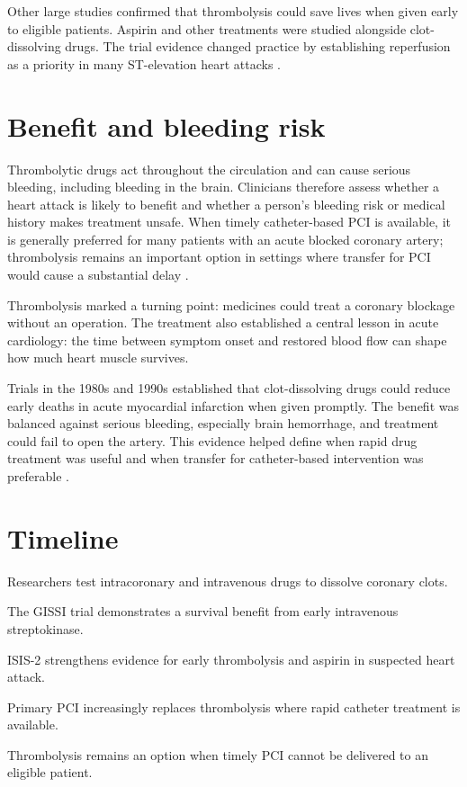 \documentclass[12pt,oneside]{book}
\begin{document}
Other large studies confirmed that thrombolysis could save lives when
given early to eligible patients. Aspirin and other treatments were
studied alongside clot-dissolving drugs. The trial evidence changed
practice by establishing reperfusion as a priority in many ST-elevation
heart attacks \cite{miTreatmentHistory}.

\section{Benefit and bleeding risk}
Thrombolytic drugs act throughout the circulation and can cause serious
bleeding, including bleeding in the brain. Clinicians therefore assess
whether a heart attack is likely to benefit and whether a person's
bleeding risk or medical history makes treatment unsafe. When timely
catheter-based PCI is available, it is generally preferred for many
patients with an acute blocked coronary artery; thrombolysis remains an
important option in settings where transfer for PCI would cause a
substantial delay \cite{ahaAcuteCoronaryGuideline}.

Thrombolysis marked a turning point: medicines could treat a coronary
blockage without an operation. The treatment also established a central
lesson in acute cardiology: the time between symptom onset and restored
blood flow can shape how much heart muscle survives.

Trials in the 1980s and 1990s established that clot-dissolving drugs could
reduce early deaths in acute myocardial infarction when given promptly. The
benefit was balanced against serious bleeding, especially brain hemorrhage,
and treatment could fail to open the artery. This evidence helped define when
rapid drug treatment was useful and when transfer for catheter-based
intervention was preferable
\cite{gissiTrial,miTreatmentHistory,ahaAcuteCoronaryGuideline}.

\section*{Timeline}
\begin{description}[leftmargin=2.3cm,style=nextline]
  \item[1950s--1970s] Researchers test intracoronary and intravenous drugs to dissolve coronary clots.
  \item[1986] The GISSI trial demonstrates a survival benefit from early intravenous streptokinase.
  \item[1988] ISIS-2 strengthens evidence for early thrombolysis and aspirin in suspected heart attack.
  \item[1990s onward] Primary PCI increasingly replaces thrombolysis where rapid catheter treatment is available.
  \item[Today] Thrombolysis remains an option when timely PCI cannot be delivered to an eligible patient.
\end{description}
\end{document}
